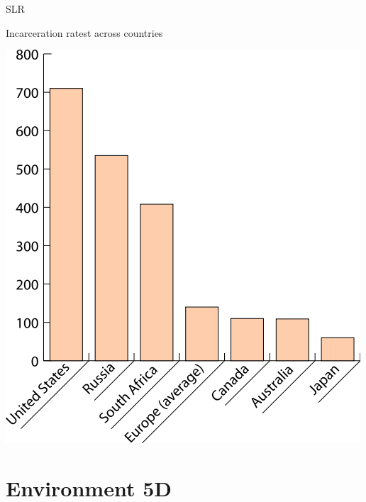 \begin{chart}{S}{LR}
\caption{Incarceration ratest across countries}
\label{chart:incarceration}
\includegraphics[width=\chartwidth,height=\chartheight]{incarceration}  
\end{chart}


\section{Environment 5D}

